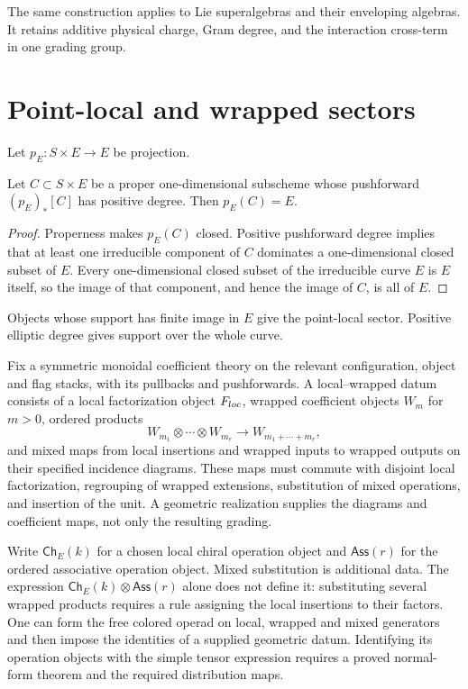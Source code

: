 The same construction applies to Lie superalgebras and their enveloping algebras. It retains additive physical charge, Gram degree, and the interaction cross-term in one grading group.

\section{Point-local and wrapped sectors}
Let $p_E:S\times E\to E$ be projection.

\begin{lemma}
Let $C\subset S\times E$ be a proper one-dimensional subscheme whose pushforward $(p_E)_*[C]$ has positive degree. Then $p_E(C)=E$.
\end{lemma}
\begin{proof}
Properness makes $p_E(C)$ closed. Positive pushforward degree implies that at least one irreducible component of $C$ dominates a one-dimensional closed subset of $E$. Every one-dimensional closed subset of the irreducible curve $E$ is $E$ itself, so the image of that component, and hence the image of $C$, is all of $E$.
\end{proof}

Objects whose support has finite image in $E$ give the point-local
sector. Positive elliptic degree gives support over the whole curve.

\begin{definition}
Fix a symmetric monoidal coefficient theory on the relevant
configuration, object and flag stacks, with its pullbacks and
pushforwards. A local--wrapped datum consists of a local
factorization object \(F_{loc}\), wrapped coefficient
objects \(W_m\) for \(m>0\), ordered products
\[
 W_{m_1}\otimes\cdots\otimes W_{m_r}
       \longrightarrow W_{m_1+\cdots+m_r},
\]
and mixed maps from local insertions and wrapped inputs to wrapped
outputs on their specified incidence diagrams. These maps must
commute with disjoint local factorization, regrouping of wrapped
extensions, substitution of mixed operations, and insertion of the
unit. A geometric realization supplies the diagrams and coefficient
maps, not only the resulting grading.
\end{definition}

Write $\mathsf{Ch}_E(k)$ for a chosen local chiral operation object
and $\mathsf{Ass}(r)$ for the ordered associative operation object.
Mixed substitution is additional data. The expression
\(\mathsf{Ch}_E(k)\otimes\mathsf{Ass}(r)\) alone does not define
it: substituting several wrapped products requires a rule assigning
the local insertions to their factors. One can form the free colored
operad on local, wrapped and mixed generators and then impose the
identities of a supplied geometric datum. Identifying its operation
objects with the simple tensor expression requires a proved
normal-form theorem and the required distribution maps.


